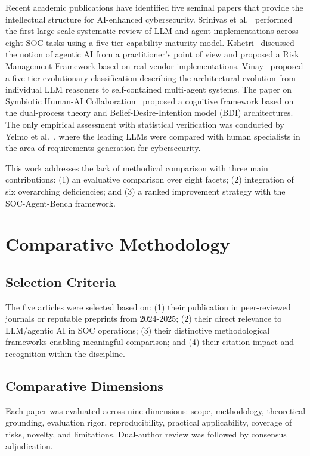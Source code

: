 \documentclass[journal]{IEEEtran}
\begin{document}
Recent academic publications have identified five seminal papers that provide the intellectual structure for AI-enhanced cybersecurity. Srinivas et al.~\cite{srinivas2025} performed the first large-scale systematic review of LLM and agent implementations across eight SOC tasks using a five-tier capability maturity model. Kshetri~\cite{kshetri2025} discussed the notion of agentic AI from a practitioner's point of view and proposed a Risk Management Framework based on real vendor implementations. Vinay~\cite{vinay2025} proposed a five-tier evolutionary classification describing the architectural evolution from individual LLM reasoners to self-contained multi-agent systems. The paper on Symbiotic Human-AI Collaboration~\cite{symbiotic2025} proposed a cognitive framework based on the dual-process theory and Belief-Desire-Intention model (BDI) architectures. The only empirical assessment with statistical verification was conducted by Yelmo et al.~\cite{yelmo2025}, where the leading LLMs were compared with human specialists in the area of requirements generation for cybersecurity.

This work addresses the lack of methodical comparison with three main contributions: (1) an evaluative comparison over eight facets; (2) integration of six overarching deficiencies; and (3) a ranked improvement strategy with the SOC-Agent-Bench framework.

\section{Comparative Methodology}
\subsection{Selection Criteria}
The five articles were selected based on: (1) their publication in peer-reviewed journals or reputable preprints from 2024-2025; (2) their direct relevance to LLM/agentic AI in SOC operations; (3) their distinctive methodological frameworks enabling meaningful comparison; and (4) their citation impact and recognition within the discipline.

\subsection{Comparative Dimensions}
Each paper was evaluated across nine dimensions: scope, methodology, theoretical grounding, evaluation rigor, reproducibility, practical applicability, coverage of risks, novelty, and limitations. Dual-author review was followed by consensus adjudication.
\end{document}
